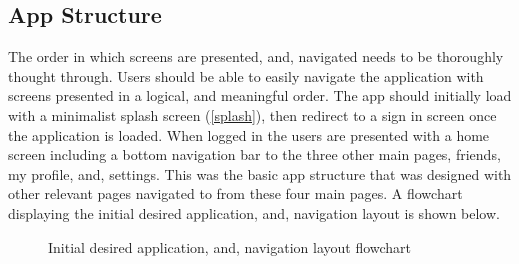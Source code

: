 \subsection*{App Structure}
The order in which screens are presented, and, navigated needs to be thoroughly thought through. Users should be able to easily navigate the application with screens presented in a logical, and meaningful order. The app should initially load with a minimalist splash screen (\ref{splash}), then redirect to a sign in screen once the application is loaded. When logged in the users are presented with a home screen including a bottom navigation bar to the three other main pages, friends, my profile, and, settings. This was the basic app structure that was designed with other relevant pages navigated to from these four main pages. A flowchart displaying the initial desired application, and, navigation layout is shown below. 

\begin{figure}[!htbp]
    \centering
    \begin{subfigure}[b]{0.6\textwidth}
    \end{subfigure}
    \caption{Initial desired application, and, navigation layout flowchart} 
    \label{fig:layoutFlow}
\end{figure}
\FloatBarrier